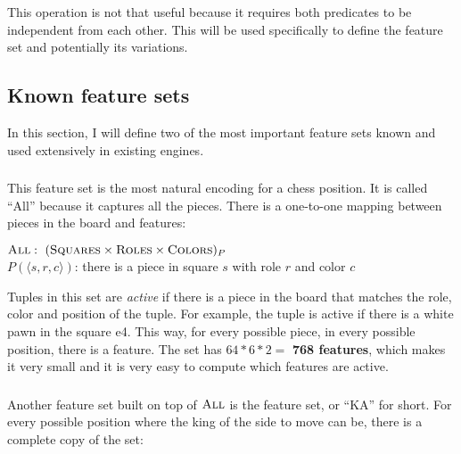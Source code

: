 This operation is not that useful because it requires both predicates to be independent from each other. This will be used specifically to define the  feature set and potentially its variations.

\newpage
\subsection{Known feature sets}

In this section, I will define two of the most important feature sets known and used extensively in existing engines.

\subsubsection{\mdseries{}}

This feature set is the most natural encoding for a chess position. It is called \enquote{All} because it captures all the pieces. There is a one-to-one mapping between pieces in the board and features:

\begin{center}
    $\textsc{All}:\ (\textsc{Squares} \times \textsc{Roles} \times \textsc{Colors})_{P}$ \\
    $P(\langle s, r, c \rangle)$: there is a piece in square $s$ with role $r$ and color $c$\\
\end{center}

Tuples in this set are \textit{active} if there is a piece in the board that matches the role, color and position of the tuple. For example, the tuple  is active if there is a white pawn in the square e4. This way, for every possible piece, in every possible position, there is a feature. The set has $64*6*2=$\textbf{ 768 features}, which makes it very small and it is very easy to compute which features are active.

\subsubsection{\mdseries{}}

Another feature set built on top of $\textsc{All}$ is the  feature set, or \enquote{KA} for short. For every possible position where the king of the side to move can be, there is a complete copy of the  set:

